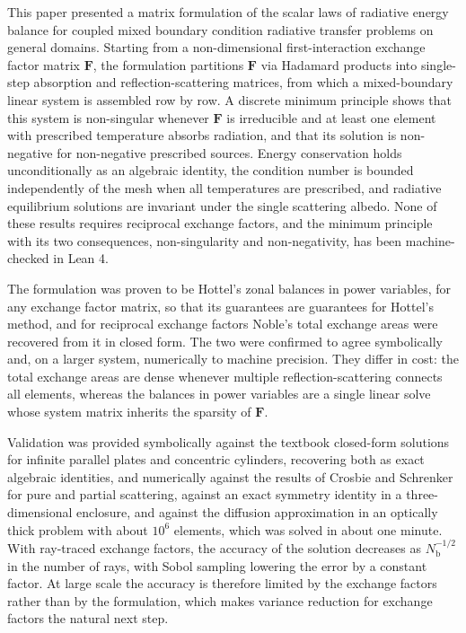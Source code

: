 \documentclass[preprint,1p,times]{elsarticle}
\theoremstyle{plain}
\theoremstyle{definition}
\theoremstyle{remark}
\begin{document}
This paper presented a matrix formulation of the scalar laws of radiative energy balance for coupled mixed boundary condition radiative transfer problems on general domains. Starting from a non-dimensional first-interaction exchange factor matrix $\mathbf{F}$, the formulation partitions $\mathbf{F}$ via Hadamard products into single-step absorption and reflection-scattering matrices, from which a mixed-boundary linear system is assembled row by row. A discrete minimum principle shows that this system is non-singular whenever $\mathbf{F}$ is irreducible and at least one element with prescribed temperature absorbs radiation, and that its solution is non-negative for non-negative prescribed sources. Energy conservation holds unconditionally as an algebraic identity, the condition number is bounded independently of the mesh when all temperatures are prescribed, and radiative equilibrium solutions are invariant under the single scattering albedo. None of these results requires reciprocal exchange factors, and the minimum principle with its two consequences, non-singularity and non-negativity, has been machine-checked in Lean 4.

The formulation was proven to be Hottel's zonal balances in power variables, for any exchange factor matrix, so that its guarantees are guarantees for Hottel's method, and for reciprocal exchange factors Noble's total exchange areas were recovered from it in closed form. The two were confirmed to agree symbolically and, on a larger system, numerically to machine precision. They differ in cost: the total exchange areas are dense whenever multiple reflection-scattering connects all elements, whereas the balances in power variables are a single linear solve whose system matrix inherits the sparsity of $\mathbf{F}$.

Validation was provided symbolically against the textbook closed-form solutions for infinite parallel plates and concentric cylinders, recovering both as exact algebraic identities, and numerically against the results of Crosbie and Schrenker for pure and partial scattering, against an exact symmetry identity in a three-dimensional enclosure, and against the diffusion approximation in an optically thick problem with about $10^6$ elements, which was solved in about one minute. With ray-traced exchange factors, the accuracy of the solution decreases as $N_\mathrm{b}^{-1/2}$ in the number of rays, with Sobol sampling lowering the error by a constant factor. At large scale the accuracy is therefore limited by the exchange factors rather than by the formulation, which makes variance reduction for exchange factors the natural next step.
\end{document}
